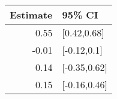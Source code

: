 \begin{tabular}{rl}
  \hline
Estimate & 95\% CI \\ 
  \hline
0.55 & [0.42,0.68] \\ 
  -0.01 & [-0.12,0.1] \\ 
  0.14 & [-0.35,0.62] \\ 
  0.15 & [-0.16,0.46] \\ 
   \hline
\end{tabular}

